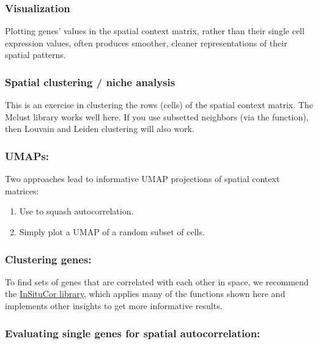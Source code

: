 \documentclass[
  letterpaper,
  DIV=11,
  numbers=noendperiod]{scrartcl}
\providecommand{\tightlist}{%
  \setlength{\itemsep}{0pt}\setlength{\parskip}{0pt}}\usepackage{longtable,booktabs,array}
\begin{document}
\hypertarget{visualization}{%
\subsubsection{Visualization}\label{visualization}}

Plotting genes' values in the spatial context matrix, rather than their
single cell expression values, often produces smoother, cleaner
representations of their spatial patterns.

\hypertarget{spatial-clustering-niche-analysis}{%
\subsubsection{Spatial clustering / niche
analysis}\label{spatial-clustering-niche-analysis}}

This is an exercise in clustering the rows (cells) of the spatial
context matrix. The Mclust library works well here. If you use subsetted
neighbors (via the  function), then
Louvain and Leiden clustering will also work.

\hypertarget{umaps}{%
\subsubsection{UMAPs:}\label{umaps}}

Two approaches lead to informative UMAP projections of spatial context
matrices:

\begin{enumerate}
\def\labelenumi{\arabic{enumi}.}
\tightlist
\item
  Use  to squash autocorrelation.
\item
  Simply plot a UMAP of a random subset of cells.
\end{enumerate}

\hypertarget{clustering-genes}{%
\subsubsection{Clustering genes:}\label{clustering-genes}}

To find sets of genes that are correlated with each other in space, we
recommend the
\href{https://github.com/Nanostring-Biostats/InSituCor}{InSituCor
library}, which applies many of the functions shown here and implements
other insights to get more informative results.

\hypertarget{evaluating-single-genes-for-spatial-autocorrelation}{%
\subsubsection{Evaluating single genes for spatial
autocorrelation:}\label{evaluating-single-genes-for-spatial-autocorrelation}}
\end{document}
